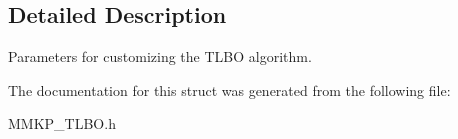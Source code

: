 \subsection{Detailed Description}
Parameters for customizing the T\+L\+B\+O algorithm. 

The documentation for this struct was generated from the following file\+:\begin{DoxyCompactItemize}
\item 
M\+M\+K\+P\+\_\+\+T\+L\+B\+O.\+h\end{DoxyCompactItemize}
